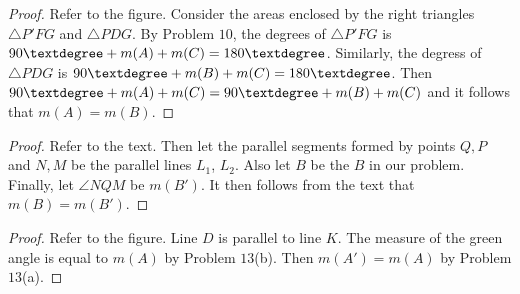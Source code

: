 \begin{proof}
    Refer to the figure. Consider the areas enclosed by the right triangles 
        $\triangle P'FG$ and $\triangle PDG$.
    By Problem $10$, the degrees of $\triangle P'FG$ is $90\textdegree + m(A) + m(C) = 180\textdegree$.
    Similarly, the degress of $\triangle PDG$ is $90\textdegree + m(B) + m(C) = 180\textdegree$.
    Then $90\textdegree + m(A) + m(C) = 90\textdegree + m(B) + m(C)$
        and it follows that $m(A) = m(B)$.
\end{proof}

\begin{proof}
    Refer to the text. Then let the parallel segments formed by points $Q, P$ and $N, M$
        be the parallel lines $L_1$, $L_2$. Also let $B$ be the $B$ in our problem.
    Finally, let $\angle NQM$ be $m(B')$.
    It then follows from the text that $m(B) = m(B')$.
\end{proof}

\begin{proof}
    Refer to the figure. Line $D$ is parallel to line $K$.
    The measure of the green angle is equal to $m(A)$ by Problem $13$(b).
    Then $m(A') = m(A)$ by Problem $13$(a).
\end{proof}
